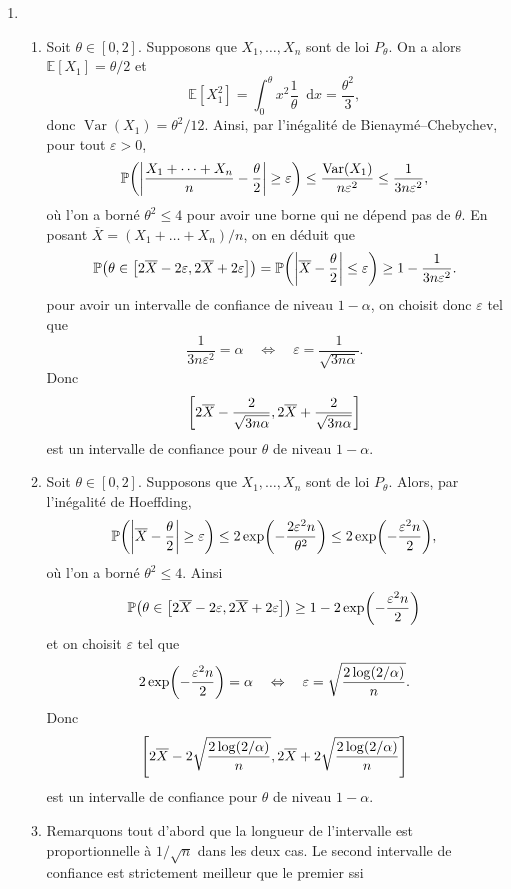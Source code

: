 \documentclass[a4paper,11pt]{article}
\let\originalleft\left
\let\originalright\right
\renewcommand{\left}{\mathopen{}\mathclose\bgroup\originalleft}
\renewcommand{\right}{\aftergroup\egroup\originalright}
\newcommand{\E}{\mathbb{E}}
\newcommand{\1}{\mathbbm{1}}
\newcommand{\Pp}[1]{\mathbb{P} \left(#1\right)}
\newcommand{\diff}{\mathop{}\mathopen{}\mathrm{d}}
\DeclareMathOperator{\Var}{Var}
\newcommand{\abs}[1]{\left\lvert#1\right\rvert}
\theoremstyle{plain}
\theoremstyle{definition}
\begin{document}
\begin{enumerate}
	\item 
	\begin{enumerate}
		\item Soit $\theta \in [0,2]$. Supposons que $X_1,\dots,X_n$ sont de loi $P_\theta$.
		On a alors $\E[X_1] = \theta/2$ et 
		\[
			\E[X_1^2] = \int_0^\theta x^2 \frac{1}{\theta} \diff x = \frac{\theta^2}{3},
		\]
		donc $\Var(X_1) = \theta^2/12$.
		Ainsi, par l'inégalité de Bienaymé--Chebychev, pour tout $\varepsilon > 0$, 
		\[
		\Pp{ \abs{\frac{X_1 + \dots + X_n}{n} - \frac{\theta}{2}} \geq \varepsilon}
		\leq \frac{\Var(X_1)}{n \varepsilon^2}
		\leq \frac{1}{3 n \varepsilon^2},
		\]
		où l'on a borné $\theta^2 \leq 4$ pour avoir une borne qui ne dépend pas de $\theta$.
		En posant $\overline{X} = (X_1 + \dots + X_n)/n$, on en déduit que
		\[
		\Pp{\theta \in \left[2\overline{X}-2\varepsilon,2\overline{X}+2\varepsilon\right]}
		= \Pp{\abs{\overline{X} - \frac{\theta}{2}} \leq \varepsilon}
		\geq 1 - \frac{1}{3 n \varepsilon^2}.
		\]
		pour avoir un intervalle de confiance de niveau $1-\alpha$, on choisit donc $\varepsilon$ tel que 
		\[
			\frac{1}{3 n \varepsilon^2} = \alpha 
			\quad \Leftrightarrow \quad 
			\varepsilon = \frac{1}{\sqrt{3n\alpha}}.
		\]
		Donc
		\[ 
		\left[2\overline{X}-\frac{2}{\sqrt{3n\alpha}},2\overline{X}+\frac{2}{\sqrt{3n\alpha}}\right]
		\]
		est un intervalle de confiance pour $\theta$ de niveau $1-\alpha$.
		\item Soit $\theta \in [0,2]$. Supposons que $X_1,\dots,X_n$ sont de loi $P_\theta$. Alors, par l'inégalité de Hoeffding,
		\[
		\Pp{ \abs{\overline{X} - \frac{\theta}{2}} \geq \varepsilon}
		\leq 2 \exp \left( - \frac{2 \varepsilon^2 n}{\theta^2} \right)
		\leq 2 \exp \left( - \frac{\varepsilon^2 n}{2} \right),
		\]
		où l'on a borné $\theta^2 \leq 4$.
		Ainsi
		\[
		\Pp{\theta \in \left[2\overline{X}-2\varepsilon,2\overline{X}+2\varepsilon\right]}
		\geq 1 - 2 \exp \left( - \frac{\varepsilon^2 n}{2} \right)
		\]
		et on choisit $\varepsilon$ tel que 
		\[
		2 \exp \left( - \frac{\varepsilon^2 n}{2} \right) = \alpha 
		\quad \Leftrightarrow \quad 
		\varepsilon = \sqrt{\frac{2 \log(2/\alpha)}{n}}.
		\]
		Donc
		\[ 
		\left[ 2\overline{X}-2\sqrt{\frac{2 \log(2/\alpha)}{n}},
		2\overline{X}+2\sqrt{\frac{2 \log(2/\alpha)}{n}} \right]
		\]
		est un intervalle de confiance pour $\theta$ de niveau $1-\alpha$.
		\item Remarquons tout d'abord que la longueur de l'intervalle est proportionnelle à $1/\sqrt{n}$ dans les deux cas.
		Le second intervalle de confiance est strictement meilleur que le premier ssi

\end{enumerate}
\end{enumerate}
\end{document}
